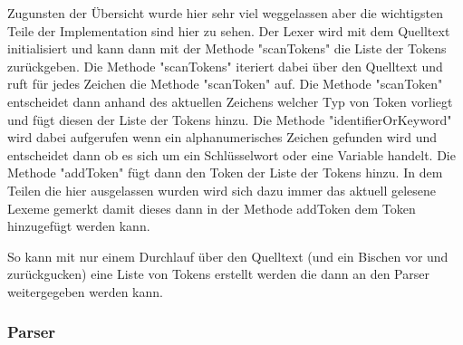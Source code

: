 \documentclass[ngerman]{article}
\begin{document}
Zugunsten der Übersicht wurde hier sehr viel weggelassen aber die wichtigsten Teile der Implementation sind hier zu sehen. Der Lexer wird mit dem Quelltext initialisiert und kann dann mit der Methode "scanTokens" die Liste der Tokens zurückgeben. Die Methode "scanTokens" iteriert dabei über den Quelltext und ruft für jedes Zeichen die Methode "scanToken" auf. Die Methode "scanToken" entscheidet dann anhand des aktuellen Zeichens welcher Typ von Token vorliegt und fügt diesen der Liste der Tokens hinzu. Die Methode "identifierOrKeyword" wird dabei aufgerufen wenn ein alphanumerisches Zeichen gefunden wird und entscheidet dann ob es sich um ein Schlüsselwort oder eine Variable handelt. Die Methode "addToken" fügt dann den Token der Liste der Tokens hinzu. In dem Teilen die hier ausgelassen wurden wird sich dazu immer das aktuell gelesene Lexeme gemerkt damit dieses dann in der Methode addToken dem Token hinzugefügt werden kann.

So kann mit nur einem Durchlauf über den Quelltext (und ein Bischen vor und zurückgucken) eine Liste von Tokens erstellt werden die dann an den Parser weitergegeben werden kann.

\subsubsection{Parser}
\end{document}
